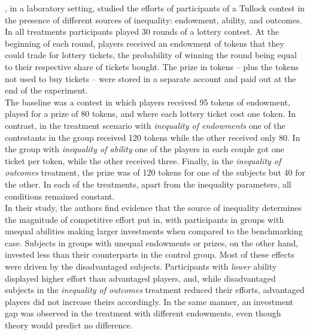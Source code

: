\cite{fallucchi2017}, in a laboratory setting, studied the efforts of participants of a Tullock contest in the presence of different sources of inequality: endowment, ability, and outcomes. In all treatments participants played 30 rounds of a lottery contest. At the beginning of each round, players received an endowment of tokens that they could trade for lottery tickets, the probability of winning the round being equal to their respective share of tickets bought. The prize in tokens -- plus the tokens not used to buy tickets -- were stored in a separate account and paid out at the end of the experiment.\\

The baseline was a contest in which players received 95 tokens of endowment, played for a prize of 80 tokens, and where each lottery ticket cost one token. In contrast, in the treatment scenario with \textit{inequality of endowments} one of the contestants in the group received 120 tokens while the other received only 80. In the group with \textit{inequality of ability} one of the players in each couple got one ticket per token, while the other received three. Finally, in the \textit{inequality of outcomes} treatment, the prize was of 120 tokens for one of the subjects but 40 for the other. In each of the treatments, apart from the inequality parameters, all conditions remained constant.\\

In their study, the authors find evidence that the source of inequality determines the magnitude of competitive effort put in, with participants in groups with unequal abilities making larger investments when compared to the benchmarking case. Subjects in groups with unequal endowments or prizes, on the other hand, invested less than their counterparts in the control group. Most of these effects were driven by the disadvantaged subjects. Participants with \textit{lower} ability displayed higher effort than advantaged players, and, while disadvantaged subjects in the \textit{inequality of outcomes} treatment reduced their efforts, advantaged players did not increase theirs accordingly. In the same manner, an investment gap was observed in the treatment with different endowments, even though theory would predict no difference.\\

